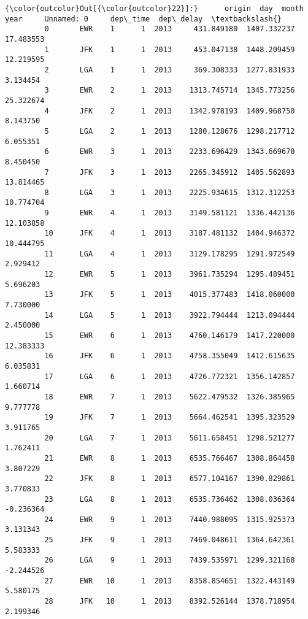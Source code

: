 \documentclass[11pt]{article}
\begin{document}
\begin{Verbatim}[commandchars=\\\{\}]
{\color{outcolor}Out[{\color{outcolor}22}]:}      origin  day  month  year     Unnamed: 0     dep\_time  dep\_delay  \textbackslash{}
         0       EWR    1      1  2013     431.849180  1407.332237  17.483553   
         1       JFK    1      1  2013     453.047138  1448.209459  12.219595   
         2       LGA    1      1  2013     369.308333  1277.831933   3.134454   
         3       EWR    2      1  2013    1313.745714  1345.773256  25.322674   
         4       JFK    2      1  2013    1342.978193  1409.968750   8.143750   
         5       LGA    2      1  2013    1280.128676  1298.217712   6.055351   
         6       EWR    3      1  2013    2233.696429  1343.669670   8.450450   
         7       JFK    3      1  2013    2265.345912  1405.562893  13.814465   
         8       LGA    3      1  2013    2225.934615  1312.312253  10.774704   
         9       EWR    4      1  2013    3149.581121  1336.442136  12.103858   
         10      JFK    4      1  2013    3187.481132  1404.946372  10.444795   
         11      LGA    4      1  2013    3129.178295  1291.972549   2.929412   
         12      EWR    5      1  2013    3961.735294  1295.489451   5.696203   
         13      JFK    5      1  2013    4015.377483  1418.060000   7.730000   
         14      LGA    5      1  2013    3922.794444  1213.094444   2.450000   
         15      EWR    6      1  2013    4760.146179  1417.220000  12.383333   
         16      JFK    6      1  2013    4758.355049  1412.615635   6.035831   
         17      LGA    6      1  2013    4726.772321  1356.142857   1.660714   
         18      EWR    7      1  2013    5622.479532  1326.385965   9.777778   
         19      JFK    7      1  2013    5664.462541  1395.323529   3.911765   
         20      LGA    7      1  2013    5611.658451  1298.521277   1.762411   
         21      EWR    8      1  2013    6535.766467  1308.864458   3.807229   
         22      JFK    8      1  2013    6577.104167  1390.829861   3.770833   
         23      LGA    8      1  2013    6535.736462  1308.036364  -0.236364   
         24      EWR    9      1  2013    7440.988095  1315.925373   3.131343   
         25      JFK    9      1  2013    7469.048611  1364.642361   5.583333   
         26      LGA    9      1  2013    7439.535971  1299.321168  -2.244526   
         27      EWR   10      1  2013    8358.854651  1322.443149   5.580175   
         28      JFK   10      1  2013    8392.526144  1378.718954   2.199346   

\end{Verbatim}
\end{document}
